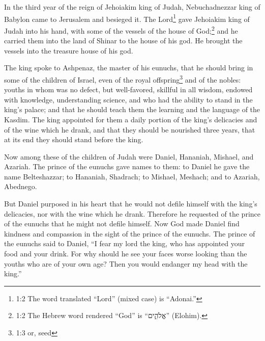 \newpage
\null
\thispagestyle{empty}
\newpage








\vspace{-1.36in}

\mychapter{} \myverse*{}In the third year of the reign of Jehoiakim king of Judah, Nebuchadnezzar king of Babylon came to Jerusalem and besieged it. \myverse{}The Lord\footnote{1:2 The word translated “Lord” (mixed case) is “Adonai.”} gave Jehoiakim king of Judah into his hand, with some of the vessels of the house of God;\footnote{1:2 The Hebrew word rendered “God” is “אֱלֹהִ֑ים” (Elohim).} and he carried them into the land of Shinar to the house of his god. He brought the vessels into the treasure house of his god.


\myverse{}The king spoke to Ashpenaz, the master of his eunuchs, that he should bring in some of the children of Israel, even of the royal offspring\footnote{1:3 or, seed} and of the nobles: \myverse{}youths in whom was no defect, but well-favored, skillful in all wisdom, endowed with knowledge, understanding science, and who had the ability to stand in the king’s palace; and that he should teach them the learning and the language of the Kasdim. \myverse{}The king appointed for them a daily portion of the king’s delicacies and of the wine which he drank, and that they should be nourished three years, that at its end they should stand before the king.


\myverse{}Now among these of the children of Judah were Daniel, Hananiah, Mishael, and Azariah. \myverse{}The prince of the eunuchs gave names to them: to Daniel he gave the name Belteshazzar; to Hananiah, Shadrach; to Mishael, Meshach; and to Azariah, Abednego.


\myverse{}But Daniel purposed in his heart that he would not defile himself with the king’s delicacies, nor with the wine which he drank. Therefore he requested of the prince of the eunuchs that he might not defile himself. \myverse{}Now God made Daniel find kindness and compassion in the sight of the prince of the eunuchs. \myverse{}The prince of the eunuchs said to Daniel, “I fear my lord the king, who has appointed your food and your drink. For why should he see your faces worse looking than the youths who are of your own age? Then you would endanger my head with the king.”


